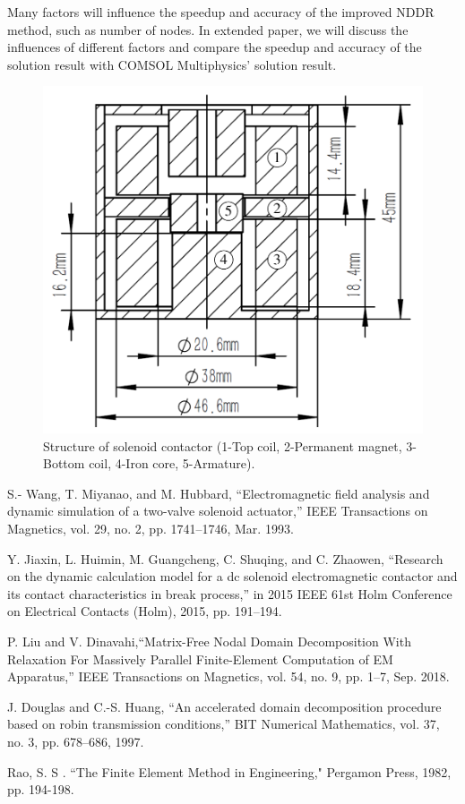 \documentclass[journal,transmag]{IEEEtran}
\begin{document}
Many factors will influence the speedup and accuracy of the improved NDDR method, such as number of nodes. In extended paper, we will discuss the influences of different factors and compare the speedup and accuracy of the solution result with COMSOL Multiphysics' solution result.
\begin{figure}
	\centering
	\includegraphics[width=0.7\linewidth]{contactor1.pdf}
	\caption{Structure of solenoid contactor (1-Top coil, 2-Permanent magnet, 3-Bottom coil, 4-Iron core, 5-Armature).}
	\label{fig:contactor}
\end{figure}


\begin{thebibliography}{1}
S.- Wang, T. Miyanao, and M. Hubbard, “Electromagnetic field analysis and dynamic simulation of a two-valve solenoid actuator,” IEEE Transactions on Magnetics, vol. 29, no. 2, pp. 1741–1746, Mar. 1993.

Y. Jiaxin, L. Huimin, M. Guangcheng, C. Shuqing, and C. Zhaowen, “Research on the dynamic calculation model for a dc solenoid electromagnetic contactor and its contact characteristics in break process,” in 2015 IEEE 61st Holm Conference on Electrical Contacts (Holm), 2015, pp. 191–194.
	

P. Liu and V. Dinavahi,``Matrix-Free Nodal Domain Decomposition With Relaxation For Massively Parallel Finite-Element Computation of EM Apparatus,” IEEE Transactions on Magnetics, vol. 54, no. 9, pp. 1–7, Sep. 2018.

J. Douglas and C.-S. Huang, “An accelerated domain decomposition procedure based on robin transmission conditions,” BIT Numerical Mathematics, vol. 37, no. 3, pp. 678–686, 1997.

Rao, S. S . ``The Finite Element Method in Engineering," Pergamon Press, 1982, pp. 194-198.

\end{thebibliography}
\end{document}
